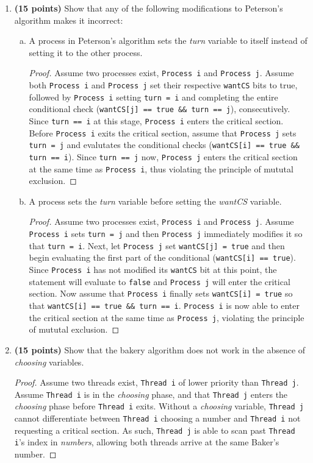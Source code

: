 \documentclass[11pt]{article}
\begin{document}
\begin{enumerate}
\item \textbf{(15 points)} Show that any of the following modifications to
  Peterson's algorithm makes it incorrect:
  \begin{enumerate}[a)]
  \item A process in Peterson's algorithm sets the \emph{turn} variable to
    itself instead of setting it to the other process.
    \begin{proof}
    Assume two processes exist, \texttt{Process i} and \texttt{Process j}. Assume both \texttt{Process i} and \texttt{Process j} set their respective  \texttt{wantCS} bits to true, followed by \texttt{Process i} setting \texttt{turn = i} and completing the entire conditional check (\texttt{wantCS[j] == true \&\& turn == j}), consecutively. Since \texttt{turn == i} at this stage, \texttt{Process i} enters the critical section. Before \texttt{Process i} exits the critical section, assume that \texttt{Process j} sets \texttt{turn = j} and evalutates the conditional checks (\texttt{wantCS[i] == true \&\& turn == i}). Since \texttt{turn == j} now, \texttt{Process j} enters the critical section at the same time as \texttt{Process i}, thus violating the principle of mututal exclusion.
    \end{proof}
  \item A process sets the \emph{turn} variable before setting the \emph{wantCS}
    variable.
        \begin{proof}
    	Assume two processes exist, \texttt{Process i} and \texttt{Process j}. Assume \texttt{Process i} sets \texttt{turn = j} and then \texttt{Process j} immediately modifies it so that \texttt{turn = i}. Next, let \texttt{Process j} set \texttt{wantCS[j] = true} and then begin evaluating the first part of the conditional (\texttt{wantCS[i] == true}). Since \texttt{Process i} has not modified its \texttt{wantCS} bit at this point, the statement will evaluate to \texttt{false} and \texttt{Process j} will enter the critical section. Now assume that \texttt{Process i} finally sets \texttt{wantCS[i] = true} so that \texttt{wantCS[i] == true \&\& turn == i}. \texttt{Process i} is now able to enter the critical section at the same time as \texttt{Process j}, violating the principle of mututal exclusion.
    \end{proof}
  \end{enumerate}

\item \textbf{(15 points)} Show that the bakery algorithm does not work in the
  absence of \emph{choosing} variables.
  	\begin{proof}
		Assume two threads exist, \texttt{Thread i} of lower priority than \texttt{Thread j}. Assume \texttt{Thread i} is in the \emph{choosing} phase, and that \texttt{Thread j} enters the \emph{choosing} phase before \texttt{Thread i} exits. Without a \emph{choosing} variable, \texttt{Thread j} cannot differentiate between \texttt{Thread i} choosing a number and \texttt{Thread i} not requesting a critical section. As such, \texttt{Thread j} is able to scan past \texttt{Thread i}'s index in \emph{numbers}, allowing both threads arrive at the same Baker's number.
		

\end{proof}
\end{enumerate}
\end{document}
